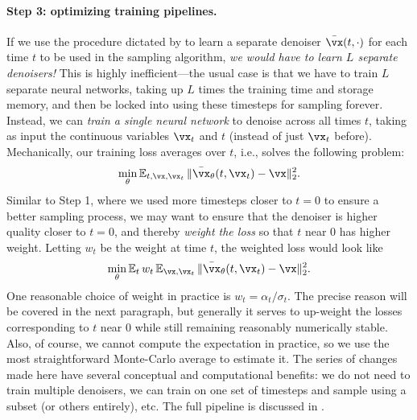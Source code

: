\documentclass[../../book-main.tex]{subfiles}
\begin{document}
\paragraph{Step 3: optimizing training pipelines.} If we use the procedure dictated by  to learn a separate denoiser \(\bar{\vx}(t, \cdot)\) for each time \(t\) to be used in the sampling algorithm, \textit{we would have to learn \(L\) separate denoisers!} This is highly inefficient---the usual case is that we have to train \(L\) separate neural networks, taking up \(L\) times the training time and storage memory, and then be locked into using these timesteps for sampling forever. Instead, we can \textit{train a single neural network} to denoise across all times \(t\), taking as input the continuous variables \(\vx_{t}\) and \(t\) (instead of just \(\vx_{t}\) before). Mechanically, our training loss averages over \(t\), i.e., solves the following problem:
\begin{equation}
	\min_{\theta}\Ex_{t, \vx, \vx_{t}}\norm{\bar{\vx}_{\theta}(t, \vx_{t}) - \vx}_{2}^{2}.
\end{equation}
Similar to Step 1, where we used more timesteps closer to \(t = 0\) to ensure a better sampling process, we may want to ensure that the denoiser is higher quality closer to \(t = 0\), and thereby \textit{weight the loss} so that \(t\) near \(0\) has higher weight. Letting \(w_{t}\) be the weight at time \(t\), the weighted loss would look like
\begin{equation}\label{eq:parametric_denoising_loss}
	\min_{\theta}\Ex_{t}w_{t}\Ex_{\vx, \vx_{t}}\norm{\bar{\vx}_{\theta}(t, \vx_{t}) - \vx}_{2}^{2}.
\end{equation}
One reasonable choice of weight in practice is \(w_{t} = \alpha_{t}/\sigma_{t}\). The precise reason will be covered in the next paragraph, but generally it serves to up-weight the losses corresponding to \(t\) near \(0\) while still remaining reasonably numerically stable. Also, of course, we cannot compute the expectation in practice, so we use the most straightforward Monte-Carlo average to estimate it. The series of changes made here have several conceptual and computational benefits: we do not need to train multiple denoisers, we can train on one set of timesteps and sample using a subset (or others entirely), etc. The full pipeline is discussed in .
\end{document}
